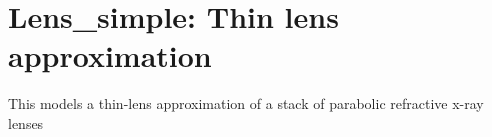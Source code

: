 \section{Lens\_simple: Thin lens approximation}
\label{s:lens-simple}


This models a thin-lens approximation of a stack of parabolic refractive x-ray lenses
